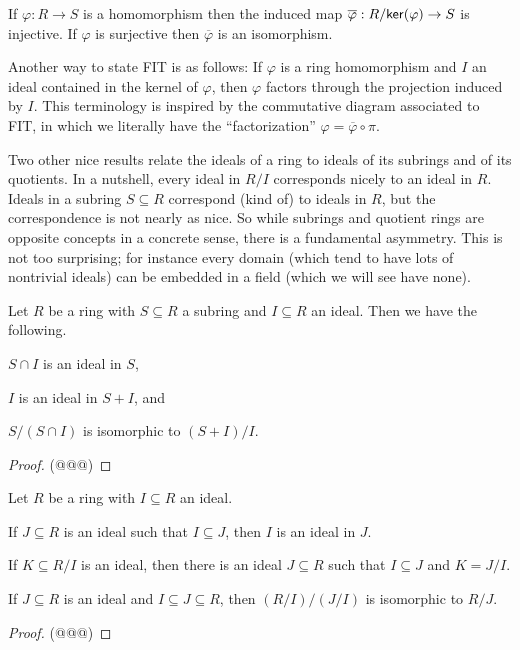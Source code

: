 \begin{cor}
If \(\varphi : R \rightarrow S\) is a homomorphism then the induced map \(\overline{\varphi} : R/ \mathsf{ker}(\varphi)  \rightarrow S\) is injective.
If \(\varphi\) is surjective then \(\overline{\varphi}\) is an isomorphism.
\end{cor}

Another way to state FIT is as follows: If \(\varphi\) is a ring homomorphism and \(I\) an ideal contained in the kernel of \(\varphi\), then \(\varphi\) factors through the projection induced by \(I\).
This terminology is inspired by the commutative diagram associated to FIT, in which we literally have the ``factorization'' \(\varphi = \overline{\varphi} \circ \pi\).

Two other nice results relate the ideals of a ring to ideals of its subrings and of its quotients.
In a nutshell, every ideal in \(R/I\) corresponds nicely to an ideal in \(R\).
Ideals in a subring \(S \subseteq R\) correspond (kind of) to ideals in \(R\), but the correspondence is not nearly as nice.
So while subrings and quotient rings are opposite concepts in a concrete sense, there is a fundamental asymmetry.
This is not too surprising; for instance every domain (which tend to have lots of nontrivial ideals) can be embedded in a field (which we will see have none).

\begin{prop}
Let \(R\) be a ring with \(S \subseteq R\) a subring and \(I \subseteq R\) an ideal.
Then we have the following.
\begin{proplist}
\item \(S \cap I\) is an ideal in \(S\),
\item \(I\) is an ideal in \(S + I\), and
\item \(S/(S \cap I)\) is isomorphic to \((S+I)/I\).
\end{proplist}
\end{prop}

\begin{proof}
(@@@)
\end{proof}

\begin{prop}
Let \(R\) be a ring with \(I \subseteq R\) an ideal.
\begin{proplist}
\item If \(J \subseteq R\) is an ideal such that \(I \subseteq J\), then \(I\) is an ideal in \(J\).
\item If \(K \subseteq R/I\) is an ideal, then there is an ideal \(J \subseteq R\) such that \(I \subseteq J\) and \(K = J/I\).
\item If \(J \subseteq R\) is an ideal and \(I \subseteq J \subseteq R\), then \((R/I)/(J/I)\) is isomorphic to \(R/J\).
\end{proplist}
\end{prop}

\begin{proof}
(@@@)
\end{proof}
